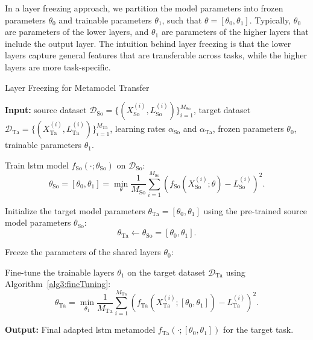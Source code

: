 In a layer freezing approach, we partition the model parameters into frozen parameters $\theta_0$ and trainable parameters $\theta_1$, such that $\theta = [\theta_0, \theta_1]$. 
Typically, $\theta_0$ are parameters of the lower layers, and $\theta_1$ are parameters of the higher layers that include the output layer.
The intuition behind layer freezing is that the lower layers capture general features that are transferable across tasks, while the higher layers are more task-specific.

\begin{algorithm}[ht!]
    \caption{Layer Freezing for Metamodel Transfer}
    \begin{algorithmic}[1] \label{alg3:layerFreezing}
        \STATE \textbf{Input:} source dataset $\mathcal{D}_{\text{So}} = \{(X_{\text{So}}^{(i)}, L_{\text{So}}^{(i)})\}_{i=1}^{M_{\text{So}}}$, target dataset $\mathcal{D}_{\text{Ta}} = \{(X_{\text{Ta}}^{(i)}, L_{\text{Ta}}^{(i)})\}_{i=1}^{M_{\text{Ta}}}$, learning rates $\alpha_{\text{So}}$ and $\alpha_{\text{Ta}}$, frozen parameters $\theta_0$, trainable parameters $\theta_1$.
        
        \STATE Train \gls{lstm} model $f_{\text{So}}(\cdot; \theta_{\text{So}})$ on $\mathcal{D}_{\text{So}}$:
        \begin{equation}
            \theta_{\text{So}} = [\theta_0, \theta_1] = \min_{\theta} \frac{1}{M_{\text{So}}} \sum_{i=1}^{M_{\text{So}}} \left( f_{\text{So}}(X_{\text{So}}^{(i)}; \theta) - L_{\text{So}}^{(i)} \right)^2.
        \end{equation}
        
        \STATE Initialize the target model parameters $\theta_{\text{Ta}} = [\theta_0, \theta_1]$ using the pre-trained source model parameters $\theta_{\text{So}}$:
        \[
        \theta_{\text{Ta}} \gets \theta_{\text{So}} = [\theta_0, \theta_1].
        \]
        
        \STATE Freeze the parameters of the shared layers $\theta_0$:
        
        \STATE Fine-tune the trainable layers $\theta_1$ on the target dataset $\mathcal{D}_{\text{Ta}}$ using Algorithm~\ref{alg3:fineTuning}:
        \begin{equation}
            \theta_{\text{Ta}} = \min_{\theta_1} \frac{1}{M_{\text{Ta}}} \sum_{i=1}^{M_{\text{Ta}}} \left( f_{\text{Ta}}(X_{\text{Ta}}^{(i)}; [\theta_0, \theta_1]) - L_{\text{Ta}}^{(i)} \right)^2.
        \end{equation}
        
        \STATE \textbf{Output:} Final adapted \gls{lstm} metamodel $f_{\text{Ta}}(\cdot; [\theta_0, \theta_1])$ for the target task.
    \end{algorithmic}
    \end{algorithm}

